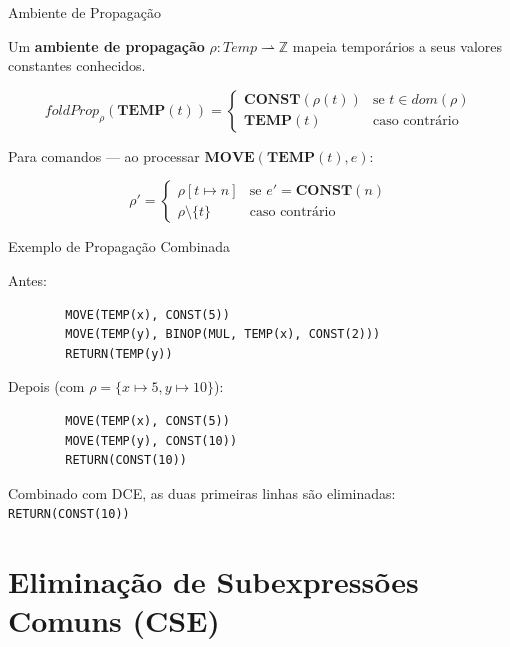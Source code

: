 \begin{frame}{Ambiente de Propagação}

    Um \textbf{ambiente de propagação}
    \(\rho : \mathit{Temp} \rightharpoonup \mathbb{Z}\) mapeia temporários a
    seus valores constantes conhecidos.

    \[\mathit{foldProp}_\rho(\mathbf{TEMP}(t)) = \begin{cases}
    \mathbf{CONST}(\rho(t)) & \text{se } t \in \mathit{dom}(\rho) \\
    \mathbf{TEMP}(t) & \text{caso contrário}
\end{cases}\]

Para comandos --- ao processar \(\mathbf{MOVE}(\mathbf{TEMP}(t), e)\):

\[\rho' = \begin{cases}
\rho[t \mapsto n] & \text{se } e' = \mathbf{CONST}(n) \\
\rho \setminus \{t\} & \text{caso contrário}
\end{cases}\]
\end{frame}

\begin{frame}[fragile]{Exemplo de Propagação Combinada}

    Antes:

    \begin{lstlisting}
        MOVE(TEMP(x), CONST(5))
        MOVE(TEMP(y), BINOP(MUL, TEMP(x), CONST(2)))
        RETURN(TEMP(y))
    \end{lstlisting}

    Depois (com \(\rho = \{x \mapsto 5, y \mapsto 10\}\)):

    \begin{lstlisting}
        MOVE(TEMP(x), CONST(5))
        MOVE(TEMP(y), CONST(10))
        RETURN(CONST(10))
    \end{lstlisting}

    Combinado com DCE, as duas primeiras linhas são eliminadas:
    \texttt{RETURN(CONST(10))}
\end{frame}


\section{Eliminação de Subexpressões Comuns
(CSE)}\label{eliminauxe7uxe3o-de-subexpressuxf5es-comuns-cse}

